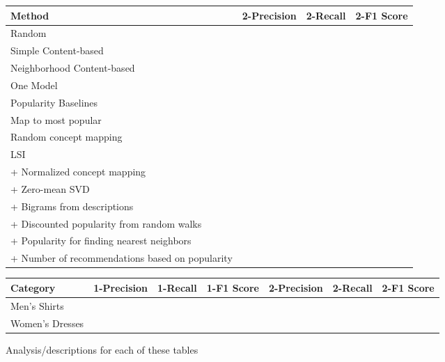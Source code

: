 \documentclass[11pt]{article}
\begin{document}
\begin{center}
\begin{tabular}{ | l | c | c | c |}
\hline
Method & 2-Precision & 2-Recall & 2-F1 Score \\ \hline\hline
Random &&&\\ \hline
Simple Content-based &&&\\ \hline
Neighborhood Content-based &&&\\ \hline
One Model &&&\\ \hline
Popularity Baselines &&&\\ \hline
\hspace*{0.5cm} Map to most popular &&&\\ \hline
\hspace*{0.5cm} Random concept mapping &&&\\ \hline
LSI &&&\\ \hline
\hspace*{0.5cm} + Normalized concept mapping &&&\\ \hline
\hspace*{0.5cm} + Zero-mean SVD &&&\\ \hline
\hspace*{0.5cm} + Bigrams from descriptions &&&\\ \hline
\hspace*{0.5cm} + Discounted popularity from random walks &&&\\ \hline
\hspace*{0.5cm} + Popularity for finding nearest neighbors &&&\\ \hline
\hspace*{0.5cm} + Number of recommendations based on popularity &&&\\ \hline

\end{tabular}
\end{center}

\begin{center}
\begin{tabular}{ | l | c | c | c | c | c | c |}
\hline
Category & 1-Precision & 1-Recall & 1-F1 Score & 2-Precision & 2-Recall & 2-F1 Score \\ \hline\hline
Men's Shirts &&&&&&\\ \hline
Women's Dresses &&&&&&\\ \hline
\end{tabular}
\end{center}

Analysis/descriptions for each of these tables
\end{document}
